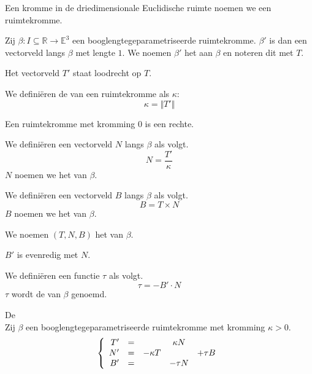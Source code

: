\documentclass[main.tex]{subfiles}
\begin{document}
\begin{de}
  Een kromme in de driedimensionale Euclidische ruimte noemen we een ruimtekromme.
\end{de}

\begin{de}
  Zij $\beta: I \subseteq \mathbb{R} \rightarrow \mathbb{E}^{3}$ een booglengtegeparametriseerde ruimtekromme.
  $\beta'$ is dan een vectorveld langs $\beta$ met lengte $1$.
  We noemen $\beta'$ het  aan $\beta$ en noteren dit met $T$.
\end{de}

\begin{st}
  Het vectorveld $T'$ staat loodrecht op $T$.
\end{st}

\begin{de}
  We defini\"eren de  van een ruimtekromme als $\kappa$:
  \[ \kappa = \Vert T' \Vert \]
\end{de}

\begin{st}
  Een ruimtekromme met kromming $0$ is een rechte.
\end{st}

\begin{de}
  We defini\"eren een vectorveld $N$ langs $\beta$ als volgt.
  \[ N = \frac{T'}{\kappa} \]
  $N$ noemen we het  van $\beta$.
\end{de}

\begin{de}
  We defini\"eren een vectorveld $B$ langs $\beta$ als volgt.
  \[ B = T \times N \]
  $B$ noemen we het  van $\beta$.
\end{de}

\begin{de}
  We noemen $(T,N,B)$ het  van $\beta$.
\end{de}

\begin{lem}
  $B'$ is evenredig met $N$.
\end{lem}
\begin{de}
  We defini\"eren een functie $\tau$ als volgt.
  \[ \tau = -B' \cdot N \]
  $\tau$ wordt de  van $\beta$ genoemd.
\end{de}

\begin{st}
  De \\
  Zij $\beta$ een booglengtegeparametriseerde ruimtekromme met kromming $\kappa>0$.
  \[
  \left\{
    \begin{array}{r cccc}
      T' &=& & \kappa N &\\
      N' &=& -\kappa T & & +\tau B\\
      B' &=& & -\tau N &\\
    \end{array}
  \right.
  \]
\end{st}
\end{document}
